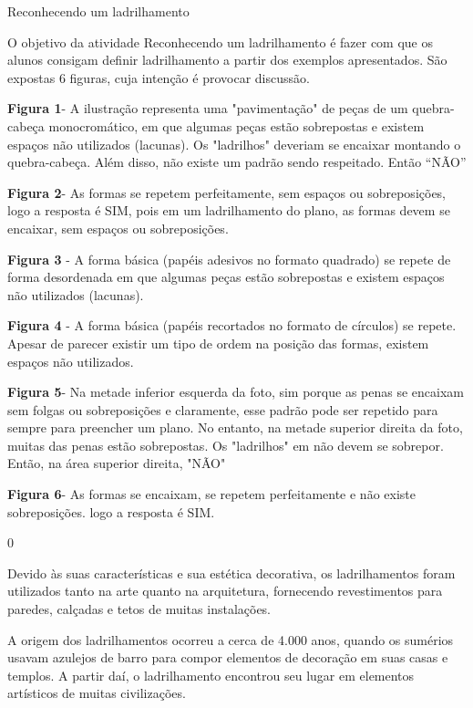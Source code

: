 \begin{answer}{Reconhecendo um ladrilhamento}
{
	O objetivo da atividade Reconhecendo um ladrilhamento é fazer com que os alunos consigam definir ladrilhamento a partir dos exemplos apresentados. São expostas 6 figuras, cuja intenção é provocar discussão.

	\textbf{Figura 1}- A ilustração representa uma "pavimentação" de peças de um quebra-cabeça monocromático, em que algumas peças estão sobrepostas e  existem  espaços não utilizados (lacunas).  Os "ladrilhos" deveriam se encaixar montando o quebra-cabeça. Além disso, não existe um padrão sendo respeitado. Então “NÃO”

	\textbf{Figura 2}- As formas se repetem perfeitamente, sem espaços ou sobreposições, logo a resposta é SIM, pois em um ladrilhamento do plano, as formas devem se encaixar, sem espaços ou sobreposições.

	\textbf{Figura 3} - A forma básica (papéis adesivos no formato quadrado) se repete de forma desordenada  em que algumas peças estão sobrepostas e  existem  espaços não utilizados (lacunas). 

	\textbf{Figura 4} - A forma básica (papéis recortados no formato de círculos) se repete. Apesar de parecer existir um tipo de ordem na posição das formas, existem espaços não utilizados.

	\textbf{Figura 5}- Na metade inferior esquerda da foto, sim porque as penas se encaixam sem folgas ou sobreposições e claramente, esse padrão pode ser repetido para sempre para preencher um plano. No entanto, na metade superior direita da foto, muitas das penas estão sobrepostas. Os "ladrilhos" em não devem se sobrepor. Então, na área superior direita, "NÃO"

	\textbf{Figura 6}-  As formas se encaixam, se repetem perfeitamente e não existe sobreposições. logo a resposta é SIM.
}{0}
\end{answer}


\label{ladri-exp-1}

Devido às suas características e sua estética decorativa, os ladrilhamentos foram utilizados tanto na arte quanto na arquitetura, fornecendo revestimentos para paredes, calçadas e tetos de muitas instalações. 

A origem dos ladrilhamentos ocorreu a cerca de  4.000 anos, quando os sumérios usavam azulejos de barro para compor elementos de decoração em suas casas e templos. A partir daí, o ladrilhamento encontrou seu lugar em elementos artísticos de muitas civilizações. 

